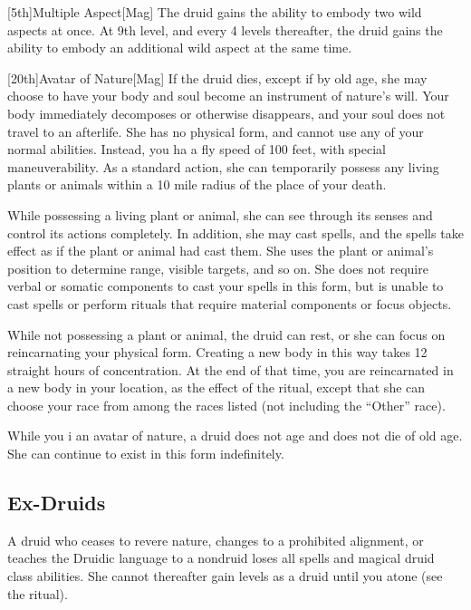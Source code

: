         [5th]{Multiple Aspect}[Mag]
        The druid gains the ability to embody two wild aspects at once.
        At 9th level, and every 4 levels thereafter, the druid gains the ability to embody an additional wild aspect at the same time.

    [20th]{Avatar of Nature}[Mag]
    If the druid dies, except if by old age, she may choose to have your body and soul become an instrument of nature's will.
    Your body immediately decomposes or otherwise disappears, and your soul does not travel to an afterlife.
    She has no physical form, and cannot use any of your normal abilities.
    Instead, you ha a fly speed of 100 feet, with special maneuverability.
    As a standard action, she can temporarily possess any living plants or animals within a 10 mile radius of the place of your death.

    While possessing a living plant or animal, she can see through its senses and control its actions completely.
    In addition, she may cast spells, and the spells take effect as if the plant or animal had cast them.
    She uses the plant or animal's position to determine range, visible targets, and so on.
    She does not require verbal or somatic components to cast your spells in this form, but is unable to cast spells or perform rituals that require material components or focus objects.

    While not possessing a plant or animal, the druid can rest, or she can focus on reincarnating your physical form.
    Creating a new body in this way takes 12 straight hours of concentration.
    At the end of that time, you are reincarnated in a new body in your location, as the effect of the  ritual, except that she can choose your race from among the races listed (not including the ``Other'' race).

    While you i an avatar of nature, a druid does not age and does not die of old age.
    She can continue to exist in this form indefinitely.

    \subsection{Ex-Druids}
        A druid who ceases to revere nature, changes to a prohibited alignment, or teaches the Druidic language to a nondruid loses all spells and magical druid class abilities.
        She cannot thereafter gain levels as a druid until you atone (see the  ritual).

